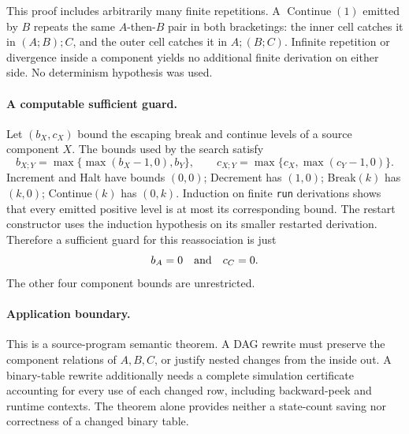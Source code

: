 This proof includes arbitrarily many finite repetitions. A
$\operatorname{Continue}(1)$ emitted by $B$ repeats the same $A$-then-$B$
pair in both bracketings: the inner cell catches it in $(A;B);C$, and the
outer cell catches it in $A;(B;C)$. Infinite repetition or divergence
inside a component yields no additional finite derivation on either
side. No determinism hypothesis was used.

\paragraph{A computable sufficient guard.}
Let $(b_X,c_X)$ bound the escaping break and continue levels of a source
component $X$. The bounds used by the search satisfy
\[
 b_{X;Y}=\max\{\max(b_X-1,0),b_Y\},\qquad
 c_{X;Y}=\max\{c_X,\max(c_Y-1,0)\}.
\]
Increment and Halt have bounds $(0,0)$; Decrement has $(1,0)$;
Break$(k)$ has $(k,0)$; Continue$(k)$ has $(0,k)$.
Induction on finite \texttt{run} derivations shows that every emitted
positive level is at most its corresponding bound. The restart
constructor uses the induction hypothesis on its smaller restarted
derivation. Therefore a sufficient guard for this reassociation is just
\[
 b_A=0\quad\hbox{and}\quad c_C=0.
\]
The other four component bounds are unrestricted.

\paragraph{Application boundary.}
This is a source-program semantic theorem. A DAG rewrite must preserve
the component relations of $A,B,C$, or justify nested changes from the
inside out. A binary-table rewrite additionally needs a complete
simulation certificate accounting for every use of each changed row,
including backward-peek and runtime contexts. The theorem alone provides
neither a state-count saving nor correctness of a changed binary table.

